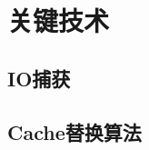 
\chapter{关键技术}
\label{cha:key_tech}

\section{IO捕获}
\label{sec:capture_io}

\section{Cache替换算法}
\label{sec:cache_algorithm}


